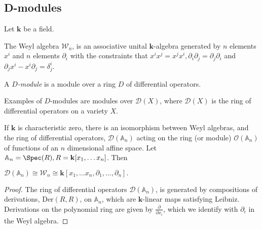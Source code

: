     \subsection{D-modules}

    Let \( \mathbf{k}\) be a field. 
    \begin{defn} 
    The Weyl algebra \( \mathcal{W}_{n}\), is an associative unital \( \mathbf{k}\)-algebra generated by \(n\) elements \( x^{i}\) and \(n\) elements \( \partial_i\) with the constraints that \( x^i x^j = x^j x^i, \partial_i \partial_j = \partial_j \partial_i\) and \( \partial_j x^i - x^i \partial_j  = \delta^{i}_j\).
    \end{defn}
    
    

    \begin{defn}[\(D\)-module] A \emph{\(D\)-module} is a module over a ring \(D\) of differential operators.
    \end{defn}
    \begin{ex}
    Examples of \(D\)-modules are modules over \( \mathcal{D}(X)\), where \( \mathcal{D}(X)\) is the ring of differential operators on a variety \(X\).
    \end{ex}
    
    
    If \( \mathbf{k}\) is characteristic zero, there is an isomorphism between Weyl algebras, and the ring of differential operators, \(\mathcal{D}( \mathbb{A}_n)\) acting on the ring (or module) \( \mathcal{O}(\mathbb{A}_n)\) of functions of an \(n\) dimensional affine space. Let \( \mathbb{A}_n = \Spec(R), R=\mathbf{k}[x_1, \dots x_n]\). Then
    \begin{lem}
    \(\mathcal{D}(\mathbb{A}_n) \cong \mathcal{W}_n \cong \mathbf{k}[x_1,\dots x_n,\partial_1, \dots , \partial_n].\)
    \end{lem}
    
    
    \begin{proof}
    The ring of differential operators \( \mathcal{D}(\mathbb{A}_n) \), is generated by compositions of derivations, \( \mathrm{Der}(R,R)\), on \(\mathbb{A}_n\), which are \(\mathbf{k}\)-linear maps satisfying Leibniz. Derivations on the polynomial ring are given by \( \frac{\partial}{\partial x_i}\), which we identify with \( \partial_i \) in the Weyl algebra.
    \end{proof}
    
